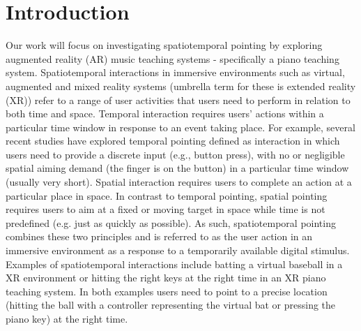 \documentclass[manuscript,screen]{acmart}
\begin{document}
\maketitle

\section{Introduction}

Our work will focus on investigating spatiotemporal pointing by exploring augmented reality (AR) music teaching systems - specifically a piano teaching system. Spatiotemporal interactions in immersive environments such as virtual, augmented and mixed reality systems (umbrella term for these is extended reality (XR)) refer to a range of user activities that users need to perform in relation to both time and space. Temporal interaction requires users’ actions within a particular time window in response to an event taking place. For example, several recent studies have explored temporal pointing \cite{lee2016modelling} defined as interaction in which users need to provide a discrete input (e.g., button press), with no or negligible spatial aiming demand (the finger is on the button) in a particular time window (usually very short). Spatial interaction requires users to complete an action at a particular place in space. In contrast to temporal pointing, spatial pointing requires users to aim at a fixed or moving target in space while time is not predefined (e.g. just as quickly as possible). As such, spatiotemporal pointing combines these two principles and is referred to as the user action in an immersive environment as a response to a temporarily available digital stimulus. Examples of spatiotemporal interactions include batting a virtual baseball in a XR environment or hitting the right keys at the right time in an XR piano teaching system. In both examples users need to point to a precise location (hitting the ball with a controller representing the virtual bat or pressing the piano key) at the right time. \\
\end{document}
